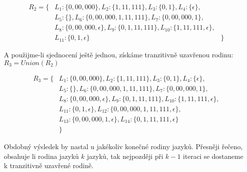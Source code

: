 \begin{align*}
R_{2} = \{&L_{1}:\{0,00,000\}, L_{2}:\{1,11,111\}, L_{3}:\{0,1\}, L_{4}:\{\epsilon\}, \\
&L_{5}:\{\}, L_{6}:\{0,00,000,1,11,111\}, L_{7}:\{0,00,000,1\},\\
&L_{8}:\{0,00,000,\epsilon\}, L_{9}:\{0, 1, 11,111\}, L_{10}:\{1, 11,111,\epsilon\},\\ &L_{11}:\{0,1,\epsilon\}
&\}
\end{align*}

A použijme-li sjednocení ještě jednou, získáme tranzitivně uzavřenou rodinu:\\
\tab$R_{3} = Union(R_{2})$

\begin{align*}
R_{3} = \{&L_{1}:\{0,00,000\}, L_{2}:\{1,11,111\}, L_{3}:\{0,1\}, L_{4}:\{\epsilon\}, \\
&L_{5}:\{\}, L_{6}:\{0,00,000,1,11,111\}, L_{7}:\{0,00,000,1\},\\
&L_{8}:\{0,00,000,\epsilon\}, L_{9}:\{0, 1, 11,111\}, L_{10}:\{1, 11,111,\epsilon\},\\ &L_{11}:\{0,1,\epsilon\},L_{12}:\{0,00,000,1,11,111,\epsilon\},\\
&L_{13}:\{0,00,000,1,\epsilon\},L_{14}:\{0,1,11,111,\epsilon\}\\
&\}
\end{align*}
 
 Obdobný výsledek by nastal u jakékoliv konečné rodiny jazyků. Přesněji řečeno, obsahuje li rodina jazyků $k$ jazyků, tak nejpozději při $k-1$ iteraci se dostaneme k tranzitivně uzavřené rodině.